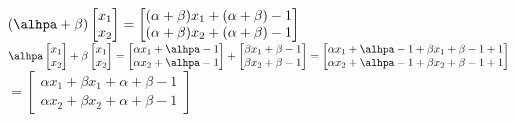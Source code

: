 \begin{solution}
		   \begin{center}
		    $
		    \left(
		    \alhpa + \beta
		    \right)
		    \begin{bmatrix}
		    x_1 \\ x_2
		    \end{bmatrix}
		    =
		    \begin{bmatrix}
		    ( \alpha +  \beta) x_1 + ( \alpha +  \beta)-1 \\ 
		    ( \alpha +  \beta) x_2 + ( \alpha +  \beta)-1
		    \end{bmatrix}
		    $
		    \\
		    $
		    \alhpa
		    \begin{bmatrix}
		    x_1 \\ x_2
		    \end{bmatrix}
		    +
		    \beta
		    \begin{bmatrix}
		    x_1 \\ x_2
		    \end{bmatrix}
		    =
		    \begin{bmatrix}
		    \alpha x_1 + \alhpa -1 \\
		    \alpha x_2 + \alhpa -1
		    \end{bmatrix}
		    +
		    \begin{bmatrix}
		    \beta x_1 + \beta -1 \\
		    \beta x_2 + \beta -1
		    \end{bmatrix}
		    =
		    \begin{bmatrix}
		    \alpha x_1 + \alhpa -1 + \beta x_1 + \beta -1 +1 \\
		    \alpha x_2 + \alhpa -1 + \beta x_2 + \beta -1 +1 
		    \end{bmatrix}
		    $
		    \\
		    $
		    =
		    \begin{bmatrix}
		    \alpha x_1 + \beta x_1 + \alpha + \beta -1 \\
		    \alpha x_2 + \beta x_2 + \alpha + \beta -1
		    \end{bmatrix}
		    $
		    \end{center}
		   
		\end{solution}